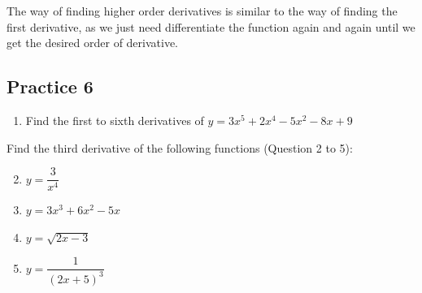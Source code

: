 \documentclass[12pt]{report}
\begin{document}
The way of finding higher order derivatives is similar to the way of finding
the first derivative, as we just need differentiate the function again and
again until we get the desired order of derivative.

\subsection*{Practice 6}
\setlength{\columnseprule}{1pt}
\setlength{\columnsep}{24pt}
\begin{multicols}{2}
  \begin{enumerate}[leftmargin=*]
    \item Find the first to sixth derivatives of $y=3x^{5}+2x^{4}-5x^{2}-8x+9$
  \end{enumerate}
  \noindent Find the third derivative of the following functions (Question 2 to 5):
  \begin{enumerate}
    \setcounter{enumi}{1}
    \item $y={\dfrac{3}{x^{4}}}$
    \item $y=3x^{3}+6x^{2}-5x$
    \item $y={\sqrt{2x-3}}$
    \item $y={\dfrac{1}{(2x+5)^{3}}}$
  \end{enumerate}
\end{multicols}
\end{document}
